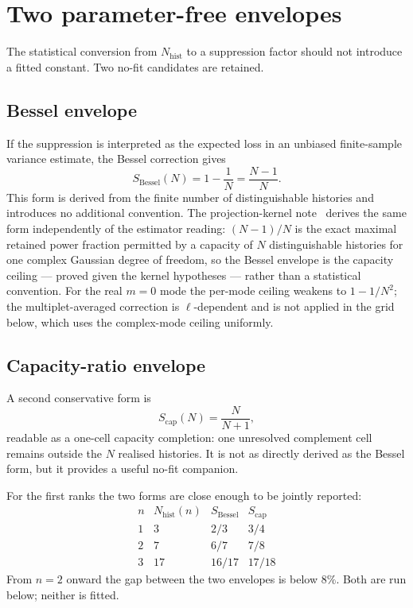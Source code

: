 \documentclass[11pt]{article}
\newcommand{\Nhist}{N_{\mathrm{hist}}}
\begin{document}
\section{Two parameter-free envelopes}
\label{sec:envelopes}

The statistical conversion from $\Nhist$ to a suppression factor should not introduce a fitted
constant.
Two no-fit candidates are retained.

\subsection{Bessel envelope}

If the suppression is interpreted as the expected loss in an unbiased finite-sample variance
estimate, the Bessel correction gives
\[
S_{\mathrm{Bessel}}(N)=1-\frac{1}{N}=\frac{N-1}{N}.
\]
This form is derived from the finite number of distinguishable histories and introduces no
additional convention.
The projection-kernel note~\cite{Beau2026pce} derives the same form independently of the estimator
reading: $(N-1)/N$ is the exact maximal retained power fraction permitted by a capacity of $N$
distinguishable histories for one complex Gaussian degree of freedom, so the Bessel envelope is the
capacity ceiling --- proved given the kernel hypotheses --- rather than a statistical convention.
For the real $m=0$ mode the per-mode ceiling weakens to $1-1/N^2$; the multiplet-averaged correction
is $\ell$-dependent and is not applied in the grid below, which uses the complex-mode ceiling
uniformly.

\subsection{Capacity-ratio envelope}

A second conservative form is
\[
S_{\mathrm{cap}}(N)=\frac{N}{N+1},
\]
readable as a one-cell capacity completion: one unresolved complement cell remains outside the $N$
realised histories.
It is not as directly derived as the Bessel form, but it provides a useful no-fit companion.

For the first ranks the two forms are close enough to be jointly reported:
\[
\begin{array}{c|c|c|c}
n & \Nhist(n) & S_{\mathrm{Bessel}} & S_{\mathrm{cap}}\\
\hline
1 & 3 & 2/3 & 3/4\\
2 & 7 & 6/7 & 7/8\\
3 & 17 & 16/17 & 17/18
\end{array}
\]
From $n=2$ onward the gap between the two envelopes is below $8\%$.
Both are run below; neither is fitted.
\end{document}
